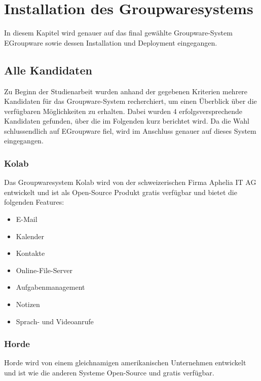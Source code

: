 \chapter{Installation des Groupwaresystems}

In diesem Kapitel wird genauer auf das final gewählte Groupware-System EGroupware sowie dessen Installation und Deployment eingegangen.

\section{Alle Kandidaten}

Zu Beginn der Studienarbeit wurden anhand der gegebenen Kriterien mehrere Kandidaten für das Groupware-System recherchiert, um einen Überblick über die verfügbaren Möglichkeiten zu erhalten.
Dabei wurden 4 erfolgsversprechende Kandidaten gefunden, über die im Folgenden kurz berichtet wird.
Da die Wahl schlussendlich auf EGroupware fiel, wird im Anschluss genauer auf dieses System eingegangen.

\subsection{Kolab}

Das Groupwaresystem Kolab wird von der schweizerischen Firma Aphelia IT AG entwickelt und ist als Open-Source Produkt gratis verfügbar und bietet die folgenden Features:

\begin{itemize}
    \item E-Mail
    \item Kalender
    \item Kontakte
    \item Online-File-Server
    \item Aufgabenmanagement
    \item Notizen
    \item Sprach- und Videoanrufe
\end{itemize}

\autocite{kolab}

\subsection{Horde}

Horde wird von einem gleichnamigen amerikanischen Unternehmen entwickelt und ist wie die anderen Systeme Open-Source und gratis verfügbar.

\autocite{horde}

